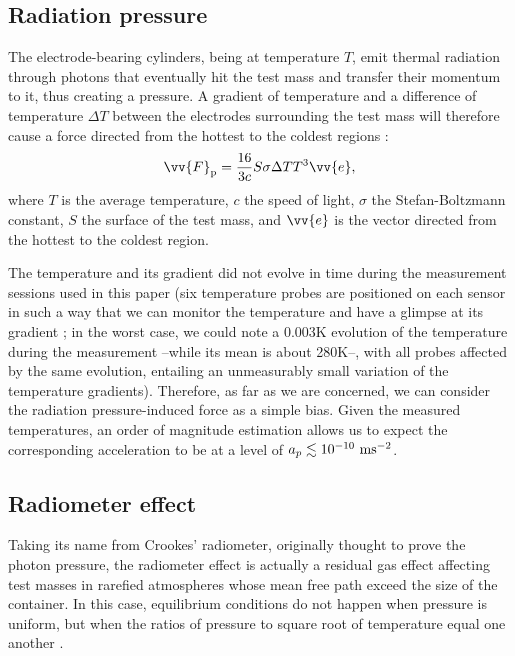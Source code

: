 \documentclass[12pt]{iopart}
\begin{document}
\subsection{Radiation pressure} \label{ssect_radp}

The electrode-bearing cylinders, being at temperature $T$, emit thermal radiation through photons that eventually hit the test mass and transfer their momentum to it, thus creating a pressure. A gradient of temperature and a difference of temperature $\Delta T$ between the electrodes surrounding the test mass will therefore cause a force directed from the hottest to the coldest regions \cite{nofrarias07, carbone07}:
\begin{equation}
\vv{F}_{\rm p} = \frac{16}{3c} S \sigma \Delta T T^3 \vv{e},
\end{equation}
where $T$ is the average temperature, $c$ the speed of light, $\sigma$ the Stefan-Boltzmann constant, $S$ the surface of the test mass, and $\vv{e}$ is the vector directed from the hottest to the coldest region.

The temperature and its gradient did not evolve in time during the measurement sessions used in this paper (six temperature probes are positioned on each sensor in such a way that we can monitor the temperature and have a glimpse at its gradient \cite{hardycqg6}; in the worst case, we could note a 0.003K evolution of the temperature during the measurement --while its mean is about 280K--, with all probes affected by the same evolution, entailing an unmeasurably small variation of the temperature gradients). Therefore, as far as we are concerned, we can consider the radiation pressure-induced force as a simple bias. Given the measured temperatures, an order of magnitude estimation allows us to expect the corresponding acceleration to be at a level of $a_p \lesssim 10^{-10}~{\rm ms}^{-2}$.


\subsection{Radiometer effect} \label{ssect_radio}

Taking its name from Crookes' radiometer, originally thought to prove the photon pressure, the radiometer effect is actually a residual gas effect affecting test masses in rarefied atmospheres whose mean free path exceed the size of the container. In this case, equilibrium conditions do not happen when pressure is uniform, but when the ratios of pressure to square root of temperature equal one another \cite{nofrarias07, carbone07}.
\end{document}
